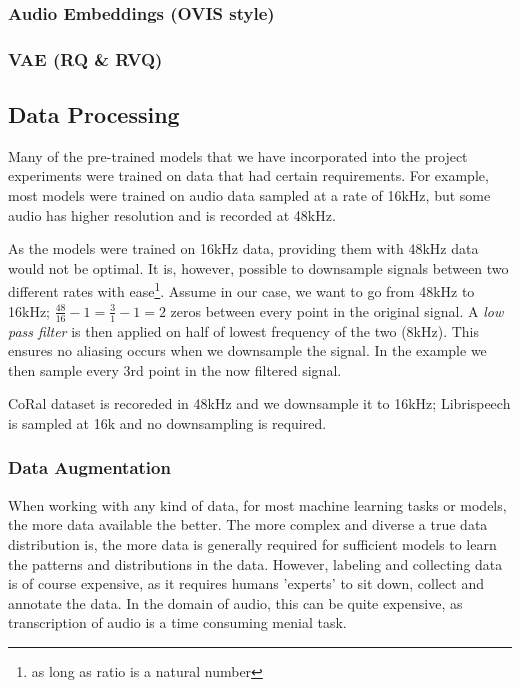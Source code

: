 \subsubsection{Audio Embeddings (OVIS style)}

\subsubsection{VAE (RQ \& RVQ)}

\subsection{Data Processing}

Many of the pre-trained models that we have incorporated into the project experiments were trained on data that had certain requirements. For example, most models were trained on audio data sampled at a rate of 16kHz, but some audio has higher resolution and is recorded at 48kHz.

As the models were trained on 16kHz data, providing them with 48kHz data would not be optimal. It is, however, possible to downsample signals between two different rates with ease\footnote{as long as ratio is a natural number}. Assume in our case, we want to go from 48kHz to 16kHz;  $\frac{48}{16} - 1 = \frac{3}{1} - 1 = 2$ zeros between every point in the original signal. A \textit{low pass filter} is then applied on half of lowest frequency of the two (8kHz). This ensures no aliasing occurs when we downsample the signal. In the example we then sample every 3rd point in the now filtered signal.

CoRal dataset is recoreded in 48kHz and we downsample it to 16kHz; Librispeech is sampled at 16k and no downsampling is required.

\subsubsection{Data Augmentation}

When working with any kind of data, for most machine learning tasks or models, the more data available the better. The more complex and diverse a true data distribution is, the more data is generally required for sufficient models to learn the patterns and distributions in the data. However, labeling and collecting data is of course expensive, as it requires humans 'experts' to sit down, collect and annotate the data. In the domain of audio, this can be quite expensive, as transcription of audio is a time consuming menial task.

